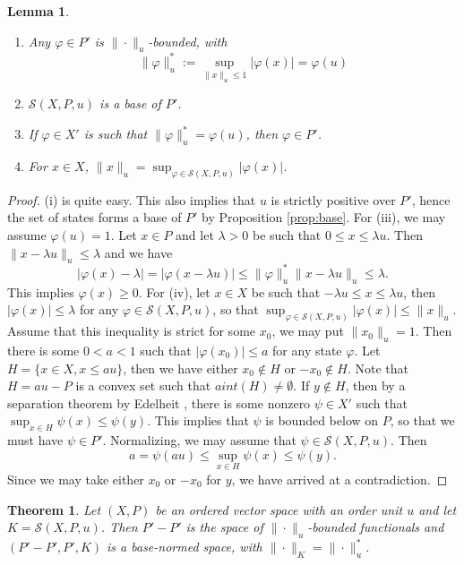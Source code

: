 \documentclass[12pt]{article}
\newtheorem{lemma}{Lemma}
\newtheorem{thm}{Theorem}
\theoremstyle{remark}
\newcommand{\<}{\langle}
\begin{document}
\begin{lemma}\label{lemma:states}
\begin{enumerate}
\item[(i)] Any $\varphi\in P'$ is $\|\cdot\|_u$-bounded, with 
\[
\|\varphi\|_u^*:=\sup_{\|x\|_u\le 1}|\varphi(x)|=\varphi(u)
\]
\item[(ii)] $\mathcal S(X,P,u)$ is a base of $P'$.
\item[(iii)] If $\varphi\in X'$ is such that $\|\varphi\|_u^*=\varphi(u)$, then $\varphi\in P'$.
\item[(iv)] For $x\in X$, $\|x\|_u=\sup_{\varphi\in \mathcal S(X,P,u)} |\varphi(x)|$.
\end{enumerate}


\end{lemma}
\begin{proof}
 (i) is quite easy. This also implies that $u$ is strictly positive over $P'$, hence the set of states forms a base of $P'$ by Proposition \ref{prop:base}. For (iii), we may assume $\varphi(u)=1$. Let $x\in P$ and let $\lambda>0$ be such that $0\le x\le \lambda u$. Then
 $\|x-\lambda u\|_u\le \lambda$ and we have
 \[
|\varphi(x)-\lambda|=|\varphi(x-\lambda u)|\le \|\varphi\|_u^*\|x-\lambda u\|_u\le \lambda.
 \]
This implies $\varphi(x)\ge 0$. For (iv), let $x\in X$ be such that  $-\lambda u\le x\le \lambda u$, then $|\varphi(x)|\le \lambda$ for any $\varphi\in \mathcal S(X,P,u)$, so that $\sup_{\varphi\in \mathcal S(X,P,u)} |\varphi(x)|\le \|x\|_u$. Assume that this inequality is strict for some $x_0$, we may put $\|x_0\|_u=1$. Then there is some $0<a<1$ such that $|\varphi(x_0)|\le a$ for any state $\varphi$. Let $H=\{x\in X, x\le au\}$, then we have either $x_0\notin H$ or $-x_0\notin H$. Note that $H=au-P$ is a convex set such that $aint(H)\ne \emptyset$. If $y\notin H$, then by a separation theorem by Edelheit \cite[0.2.4]{jameson}, there is some nonzero $\psi\in X'$ such that $\sup_{x\in H}\psi(x)\le \psi(y)$. This implies that $\psi$ is bounded below on $P$, so that we must have $\psi\in P'$. 
 Normalizing, we may assume that $\psi\in \mathcal S(X,P,u)$. Then
 \[
a=\psi(au)\le\sup_{x\in H}\psi(x)\le \psi(y).
 \]
Since we may take either $x_0$ or $-x_0$ for $y$, we have arrived at a contradiction.

\end{proof}



\begin{thm}\label{thm:ou_dual} Let $(X,P)$ be an ordered vector space with an order unit $u$ and let $K=\mathcal S(X,P,u)$.
Then $P'-P'$ is the space of $\|\cdot\|_u$-bounded functionals  and  $(P'-P',P',K)$  is a base-normed space, with $\|\cdot\|_K=\|\cdot\|_u^*$. 

\end{thm}
\end{document}
